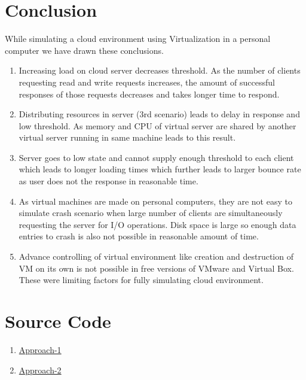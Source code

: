 \documentclass[11pt]{article}
\begin{document}
\section{Conclusion}\label{conclusion}
While simulating a cloud environment using Virtualization in a personal computer we have drawn these conclusions.
\begin{enumerate}
    \item Increasing load on cloud server decreases threshold. As the number of clients requesting read and write requests increases, the amount of successful responses of those requests decreases and takes longer time to respond.
    \item Distributing resources in server (3rd scenario) leads to delay in response and low threshold. As memory and CPU of virtual server are shared by another virtual server running in same machine leads to this result.
    \item Server goes to low state and cannot supply enough threshold to each client which leads to longer loading times which further leads to larger bounce rate as user does not the response in reasonable time.
    \item As virtual machines are made on personal computers, they are not easy to simulate crash scenario when large number of clients are simultaneously requesting the server for I/O operations. Disk space is large so enough data entries to crash is also not possible in reasonable amount of time.
    \item Advance controlling of virtual environment like creation and destruction of VM on its own is not possible in free versions of VMware and Virtual Box. These were limiting factors for fully simulating cloud environment.
\end{enumerate}

\section{Source Code}\label{source-code}
\begin{enumerate}
    \item \href{https://github.com/PrayagPanta/Throughput-Measurement-using-PHP}{Approach-1}
    \item \href{https://github.com/ArshdeepSingh98/Virtual-Client-Server}{Approach-2}
\end{enumerate}
\end{document}
